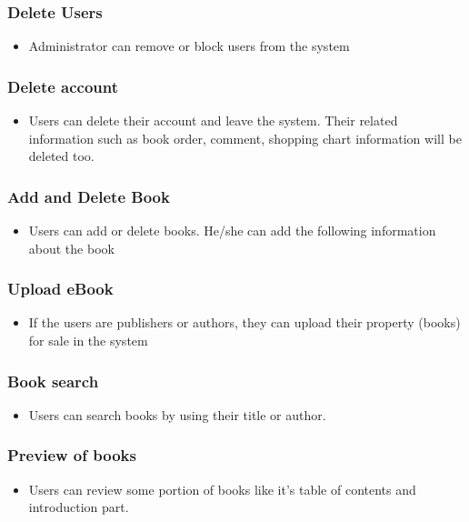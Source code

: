 	\subsubsection{Delete Users}
	\begin{itemize}
		\item Administrator can remove or block users from the system
	\end{itemize}

	\subsubsection{Delete account}
	\begin{itemize}
		\item Users can delete their account and leave the system. Their related information such as book order, comment, shopping chart information will be deleted too.
	\end{itemize}

	\subsubsection{Add and Delete Book}
	\begin{itemize}
		\item Users can add or delete books. He/she can add the following information about the book
	\end{itemize}

	\subsubsection{Upload eBook}
	\begin{itemize}
		\item If the users are publishers or authors, they can upload their property (books) for sale in the system
	\end{itemize}

	\subsubsection{Book search}
	\begin{itemize}
		\item Users can search books by using their title or author.
	\end{itemize}

	\subsubsection{Preview of books}
	\begin{itemize}
		\item Users can review some portion of books like it's table of contents and introduction part.
	\end{itemize}


